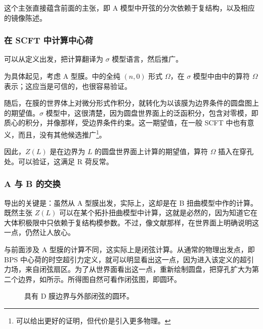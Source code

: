 这个主张直接蕴含前面的主张，即 A 模型中开弦的分次依赖于复结构，以及相应的镜像陈述。

\subsubsection{在 SCFT 中计算中心荷}\label{sec:5.3.5.2}

可以从定义出发，把计算翻译为 $\sigma$ 模型语言，然后推广。

为具体起见，考虑 A 型膜。中的全纯 $(n,0)$ 形式 $\Omega$，在 $\sigma$ 模型中由中的算符 $\Omega$ 表示；这应当是可信的，也很容易验证。

随后，在膜的世界体上对微分形式作积分，就转化为以该膜为边界条件的圆盘图上的期望值。$\sigma$ 模型中，这很清楚，因为圆盘世界面上的泛函积分，包含对零模，即质心的积分，并像那样，受边界条件约束。这一期望值，在一般 SCFT 中也有意义，而且，没有其他候选推广\footnote{可以给出更好的证明，但代价是引入更多物理。}。

因此，$Z(L)$ 是在边界为 $L$ 的圆盘世界面上计算的期望值，算符 $\Omega$ 插入在穿孔处。可以验证，这满足 R 荷反常。

\subsubsection{A 与 B 的交换}\label{sec:5.3.5.3}

导出的关键是：虽然从 A 型膜出发，实际上，这却是在 B 扭曲模型中作的计算。既然主张 $Z(L)$ 可以在某个拓扑扭曲模型中计算，这就是必然的，因为知道它在大体积极限中只依赖于复结构模参数。不过，像文献那样，在世界面上明确说明这一点，仍然让人放心。

与前面涉及 A 型膜的计算不同，这实际上是闭弦计算。从通常的物理出发点，即 BPS 中心荷的时空超引力定义，就可以明显看出这一点，因为进入该定义的超引力场，来自闭弦扇区。为了从世界面看出这一点，重新绘制圆盘，把穿孔扩大为第二个边界，如所示。所得图自然可看作闭弦图，即圆环。
\begin{figure}[H]
\centering
{}
\caption{具有 D 膜边界与外部闭弦的圆环。}\label{fig:5.4}
\end{figure}

